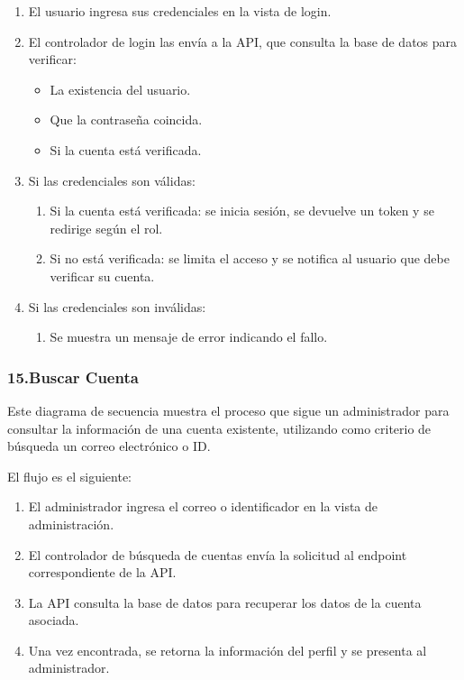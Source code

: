 \begin{enumerate}
\item El usuario ingresa sus credenciales en la vista de login.
\item El controlador de login las envía a la API, que consulta la base de datos para verificar:
\begin{itemize}
    \item La existencia del usuario.
    \item Que la contraseña coincida.
    \item Si la cuenta está verificada.
\end{itemize}

\item Si las credenciales son válidas:
\begin{enumerate}
    \item Si la cuenta está verificada: se inicia sesión, se devuelve un token y se redirige según el rol.
    \item Si no está verificada: se limita el acceso y se notifica al usuario que debe verificar su cuenta.
\end{enumerate}

\item Si las credenciales son inválidas:
\begin{enumerate}
	\item Se muestra un mensaje de error indicando el fallo.
\end{enumerate}
\end{enumerate}

\subsubsection*{15.Buscar Cuenta}

Este diagrama de secuencia muestra el proceso que sigue un administrador para consultar la información de una cuenta existente, utilizando como criterio de búsqueda un correo electrónico o ID.

El flujo es el siguiente:

\begin{enumerate}
    \item El administrador ingresa el correo o identificador en la vista de administración.
    \item El controlador de búsqueda de cuentas envía la solicitud al endpoint correspondiente de la API.
    \item La API consulta la base de datos para recuperar los datos de la cuenta asociada.
    \item Una vez encontrada, se retorna la información del perfil y se presenta al administrador.
\end{enumerate}

